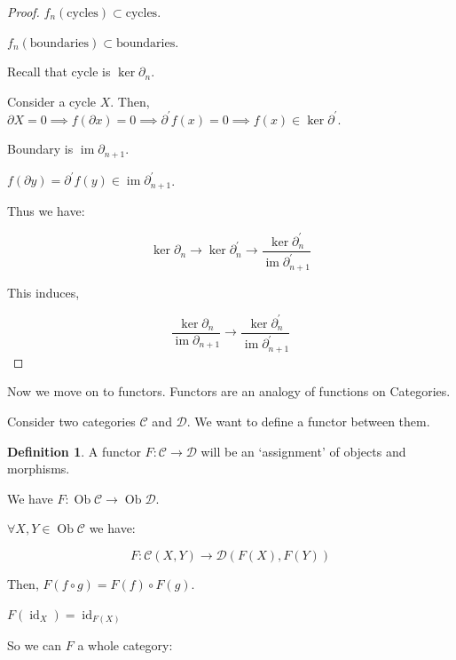 \documentclass{article}
\theoremstyle{definition}
\newtheorem*{definition}{Definition}
\begin{document}
    \begin{proof}
        \(f_n(\text{cycles}) \subset \text{cycles}\).
        
        \(f_n(\text{boundaries}) \subset \text{boundaries}\).
        
        Recall that cycle is \(\ker \partial_n\).

        Consider a cycle \(X\). Then, \(\partial X = 0 \implies f(\partial x) = 0 \implies \partial ^{\prime} f(x) = 0 \implies f(x) \in \ker \partial ^{\prime}\).

        Boundary is \(\operatorname{im} \partial_{n+1}\).

        \(f(\partial y) = \partial ^{\prime} f(y) \in \operatorname{im} \partial_{n+1}^{\prime}\).

        Thus we have:
        
        \[
            \ker \partial_n \to \ker \partial_n^{\prime} \to \frac{\ker \partial_n^{\prime}}{\operatorname{im} \partial_{n+1}^{\prime}}
        \]

        This induces,

        \[
            \frac{\ker \partial_n}{\operatorname{im} \partial_{n+1}} \to \frac{\ker \partial_n^{\prime}}{\operatorname{im} \partial_{n+1}^{\prime}}
        \]

    \end{proof}

    Now we move on to functors. Functors are an analogy of functions on Categories.

    Consider two categories \(\mathcal{C}\) and \(\mathcal{D}\). We want to define a functor between them.

    \begin{definition}
        A functor \(F: \mathcal{C} \to \mathcal{D}\) will be an `assignment' of objects and morphisms.
        
        We have \(F: \operatorname{Ob} \mathcal{C} \to \operatorname{Ob} \mathcal{D}\).
        
        \(\forall X,Y \in \operatorname{Ob} \mathcal{C}\) we have:

        \[
            F: \mathcal{C}(X,Y) \to \mathcal{D}(F(X),F(Y))
        \]

        Then, \(F(f \circ g) = F(f) \circ F(g)\).

        \(F(\operatorname{id}_{X}) = \operatorname{id}_{F(X)}\) 
    \end{definition}

    So we can \(F\) a whole category:
\end{document}
